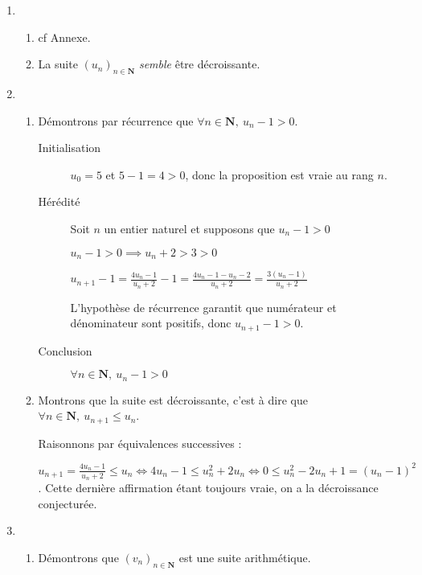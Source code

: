 \documentclass[a4paper,12pt,french]{article}
\newcommand{\N}{\mathbf{N}}
\renewcommand{\u}{(u_n)_{n\in\N}}
\begin{document}
\pagebreak

\begin{Answer}[number=1]
  \begin{enumerate}
    \item \begin{enumerate}
        \item cf Annexe.
        \item La suite $\u$ \emph{semble} être décroissante.
      \end{enumerate}
    \item \begin{enumerate}
        \item Démontrons par récurrence que $\forall n\in\N,\ u_n -1 >
          0$.

          \begin{description}
            \item[Initialisation] $u_0 = 5$ et $5 - 1 = 4 > 0$, donc la
              proposition est vraie au rang $n$.
            \item[Hérédité] Soit $n$ un entier naturel et supposons que
              $u_n-1 > 0$

              $u_n - 1 > 0 \implies u_n + 2 > 3 > 0$

              $u_{n+1} - 1 = \frac{4u_n -1}{u_n+2} - 1 = \frac{4u_n - 1
              - u_n -2}{u_n + 2} = \frac{3(u_n -1)}{u_n+2}$

              L'hypothèse de récurrence garantit que numérateur et
              dénominateur sont positifs, donc $\boxed{u_{n+1} -1 > 0}$.
            \item[Conclusion] $\forall n \in \N,\ u_n -1 >0$
          \end{description}
        \item Montrons que la suite est décroissante, c'est à dire que
          $\forall n \in \N,\ u_{n+1} \leqslant u_n$.

          Raisonnons par équivalences successives :

          $u_{n+1} = \frac{4u_n -1}{u_n+2} \leqslant u_n \iff 4u_n -1
          \leqslant u_n^2 + 2u_n \iff 0\leqslant u_n^2 - 2u_n +1 = (u_n
          -1)^2$. Cette dernière affirmation étant toujours vraie, on a
          la décroissance conjecturée.
      \end{enumerate}
    \item \begin{enumerate}
        \item Démontrons que $(v_n)_{n\in\N}$ est une suite
          arithmétique.


\end{enumerate}
\end{enumerate}
\end{Answer}
\end{document}
